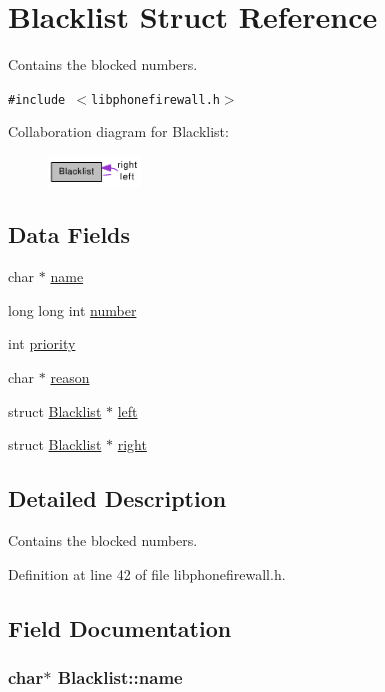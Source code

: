 \hypertarget{structBlacklist}{
\section{Blacklist Struct Reference}
\label{structBlacklist}
}
Contains the blocked numbers.  


{\tt \#include $<$libphonefirewall.h$>$}

Collaboration diagram for Blacklist:\nopagebreak
\begin{figure}[H]
\begin{center}
\leavevmode
\includegraphics[width=70pt]{structBlacklist__coll__graph}
\end{center}
\end{figure}
\subsection*{Data Fields}
\begin{CompactItemize}
\item 
char $\ast$ \hyperlink{structBlacklist_85e3b3043e9490ab2851dea24e456104}{name}
\item 
long long int \hyperlink{structBlacklist_f49a3f50339083daf291a6237c9a9bef}{number}
\item 
int \hyperlink{structBlacklist_a5370eb6240b6e528ce56fb10d7e9249}{priority}
\item 
char $\ast$ \hyperlink{structBlacklist_4aaebfcc863267f326258e0622bf7303}{reason}
\item 
struct \hyperlink{structBlacklist}{Blacklist} $\ast$ \hyperlink{structBlacklist_0be77041c99c30786d7aa28d6612d90f}{left}
\item 
struct \hyperlink{structBlacklist}{Blacklist} $\ast$ \hyperlink{structBlacklist_86826704e9c8385b086560b4ec190a8f}{right}
\end{CompactItemize}


\subsection{Detailed Description}
Contains the blocked numbers. 

Definition at line 42 of file libphonefirewall.h.

\subsection{Field Documentation}
\hypertarget{structBlacklist_85e3b3043e9490ab2851dea24e456104}{
\subsubsection{\setlength{\rightskip}{0pt plus 5cm}char$\ast$ {\bf Blacklist::name}}}
\label{structBlacklist_85e3b3043e9490ab2851dea24e456104}




